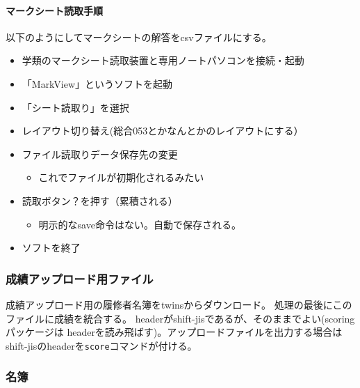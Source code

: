\paragraph{マークシート読取手順}
\label{マークシート読取手順}

以下のようにしてマークシートの解答をcsvファイルにする。

\begin{itemize}
\item 学類のマークシート読取装置と専用ノートパソコンを接続・起動

\item 「MarkView」というソフトを起動

\item 「シート読取り」を選択

\item レイアウト切り替え(総合053とかなんとかのレイアウトにする）

\item ファイル読取りデータ保存先の変更

\begin{itemize}
\item これでファイルが初期化されるみたい

\end{itemize}

\item 読取ボタン？を押す（累積される）

\begin{itemize}
\item 明示的なsave命令はない。自動で保存される。

\end{itemize}

\item ソフトを終了

\end{itemize}

\subsubsection{成績アップロード用ファイル}
\label{成績アップロード用ファイル}

成績アップロード用の履修者名簿をtwinsからダウンロード。
処理の最後にこのファイルに成績を統合する。
headerがshift-jisであるが、そのままでよい(scoringパッケージは
headerを読み飛ばす)。アップロードファイルを出力する場合は
shift-jisのheaderを\texttt{score}コマンドが付ける。

\subsubsection{名簿}
\label{名簿}


